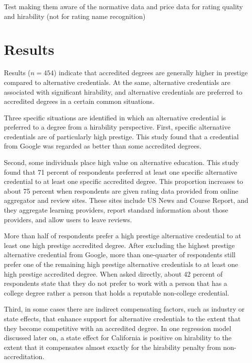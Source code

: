 \documentclass[review]{elsarticle}
\begin{document}
Test making them aware of the normative data and price data for rating quality and hirability (not for rating name recognition)

\section{Results}


Results ($n = 454$) indicate that accredited degrees are generally higher in prestige compared to alternative credentials.
At the same, alternative credentials are associated with significant hirability,
and alternative credentials are preferred to accredited degrees in a certain common situations.

Three specific situations are identified in which an alternative credential is preferred to a degree from a hirability perspective.
First, specific alternative credentials are of particularly high prestige.
This study found that a credential from Google was regarded as better than some accredited degrees.

Second, some individuals place high value on alternative education.
This study found that 71 percent of respondents preferred at least one specific alternative credential to at least one specific accredited degree.
This proportion increases to about 75 percent when respondents are given rating data provided from online aggregator and review sites.
These sites include US News and Course Report, and they aggregate learning providers, report standard information about those providers, and allow users to leave reviews.

More than half of respondents prefer a high prestige alternative credential to at least one high prestige accredited degree.
After excluding the highest prestige alternative credential from Google,
more than one-quarter of respondents still prefer one of the remaining high prestige alternative credentials to at least one high prestige accredited degree.
When asked directly, about 42 percent of respondents state that they do not prefer
to work with a person that has a college degree rather a person that holds a reputable non-college credential.

Third, in some cases there are indirect compensating factors, such as industry or state effects,
that enhance support for alternative credentials to the extent that they become competitive with an accredited degree.
In one regression model discussed later on, a state effect for California is positive on hirability
to the extent that it compensates almost exactly for the hirability penalty from non-accreditation.
\end{document}
